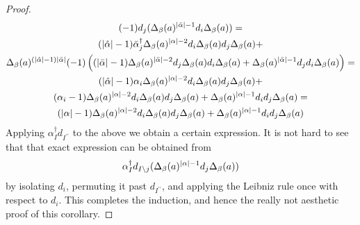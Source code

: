 \begin{cor}
\begin{proof}
\begin{gather*}
      (-1) d_j ( \Delta_\beta(a)^{\abs{\bar\alpha}-1} %
      d_i \Delta_\beta(a) ) = \\%
    (\abs{\hat\alpha}-1)\bar\alpha^\dagger_j%
      \Delta_\beta(a)^{\abs{\alpha} - 2} %
      d_i \Delta_\beta(a) d_j \Delta_\beta (a) %
      + \\%
      \Delta_\beta(a)^{(\abs{\hat\alpha}-1)\abs{\bar\alpha}} %
      (-1) \left( %
      (\abs{\bar\alpha}-1) %
      \Delta_\beta (a)^{\abs{\bar\alpha}-2} %
      d_j \Delta_\beta (a) d_i \Delta_\beta (a) %
      + %
      \Delta_\beta(a)^{\abs{\bar\alpha}-1} %
      d_j d_i \Delta_\beta(a)
      \right) = \\%
    (\abs{\hat\alpha}-1)\alpha_i%
      \Delta_\beta(a)^{\abs{\alpha} - 2} %
      d_i \Delta_\beta(a) d_j \Delta_\beta (a) %
      + \\%
      (\alpha_i-1) %
      \Delta_\beta(a)^{\abs{\alpha}-2} %
      d_i \Delta_\beta (a) d_j \Delta_\beta (a) %
      + %
      \Delta_\beta(a)^{\abs{\alpha}-1} %
      d_i d_j \Delta_\beta(a) = \\%
    (\abs{\alpha}-1)%
      \Delta_\beta(a)^{\abs{\alpha} - 2} %
      d_i \Delta_\beta(a) d_j \Delta_\beta (a) %
      + %
      \Delta_\beta(a)^{\abs{\alpha}-1} %
      d_i d_j \Delta_\beta(a)%
    \end{gather*}
  Applying $\alpha^\dagger_I d_{I^{\prime\prime}}$ to the above we obtain a certain expression. It is not hard to see that that exact expression can be obtained from
  \begin{equation*}
    \alpha^\dagger_I d_{I \setminus j} %
      ( \Delta_\beta(a)^{\abs{\alpha}-1} d_j \Delta_\beta (a) )
  \end{equation*}
  by isolating $d_i$, permuting it past $d_{I^{\prime\prime}}$, and applying the Leibniz rule once with respect to $d_i$. This completes the induction, and hence the really not aesthetic proof of this corollary.
  \end{proof}
  \end{cor}
